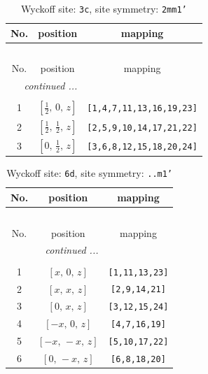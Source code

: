 \documentclass[fleqn,8pt]{jsarticle}
\begin{document}
\begin{longtable}{ccc}
\caption{Wyckoff site: {\tt 3c}, site symmetry: {\tt 2mm1'}}
 \\
 \hline \hline
No. & position & mapping \\ \hline \endfirsthead

\multicolumn{2}{l}{\tablename\ \thetable{}} \\
 \hline \hline
No. & position & mapping \\ \hline \endhead

 \hline \hline
\multicolumn{2}{r}{\footnotesize\it continued ...} \\ \endfoot

 \hline \hline
\multicolumn{2}{r}{} \\ \endlastfoot

1 & $\left[ \frac{1}{2},\, 0,\, z \right]$ & {\tt [1,4,7,11,13,16,19,23]} \\ \hline
2 & $\left[ \frac{1}{2},\, \frac{1}{2},\, z \right]$ & {\tt [2,5,9,10,14,17,21,22]} \\ \hline
3 & $\left[ 0,\, \frac{1}{2},\, z \right]$ & {\tt [3,6,8,12,15,18,20,24]} \\
\end{longtable}
\renewcommand{\arraystretch}{1.2}
\begin{longtable}{ccc}
\caption{Wyckoff site: {\tt 6d}, site symmetry: {\tt ..m1'}}
 \\
 \hline \hline
No. & position & mapping \\ \hline \endfirsthead

\multicolumn{2}{l}{\tablename\ \thetable{}} \\
 \hline \hline
No. & position & mapping \\ \hline \endhead

 \hline \hline
\multicolumn{2}{r}{\footnotesize\it continued ...} \\ \endfoot

 \hline \hline
\multicolumn{2}{r}{} \\ \endlastfoot

1 & $\left[ x,\, 0,\, z \right]$ & {\tt [1,11,13,23]} \\ \hline
2 & $\left[ x,\, x,\, z \right]$ & {\tt [2,9,14,21]} \\ \hline
3 & $\left[ 0,\, x,\, z \right]$ & {\tt [3,12,15,24]} \\ \hline
4 & $\left[ - x,\, 0,\, z \right]$ & {\tt [4,7,16,19]} \\ \hline
5 & $\left[ - x,\, - x,\, z \right]$ & {\tt [5,10,17,22]} \\ \hline
6 & $\left[ 0,\, - x,\, z \right]$ & {\tt [6,8,18,20]} \\
\end{longtable}
\end{document}
